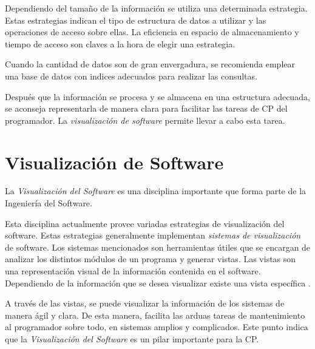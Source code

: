 \documentclass[a4paper,12pt]{report}
\begin{document}
Dependiendo del tamaño de la información se utiliza una determinada estrategia. Estas estrategias indican el tipo de estructura de datos a utilizar y las operaciones de acceso sobre ellas\cite{AAJU88,TSTA80}. La eficiencia en espacio de almacenamiento y tiempo de acceso son claves a la hora de elegir una estrategia.

Cuando la cantidad de datos son de gran envergadura, se recomienda emplear una base de datos con indices adecuados para realizar las consultas\cite{ERNS99}.

Después que la información se procesa y se almacena en una estructura adecuada, se aconseja representarla de manera clara para facilitar las tareas de CP del programador. La \textit{visualización de software} permite llevar a cabo esta tarea.


\section{Visualización de Software}

La \textit{Visualización del Software} es una disciplina importante que forma parte de la Ingeniería del Software.


Esta disciplina actualmente provee variadas estrategias de visualización del software. Estas estrategias generalmente implementan \textit{sistemas de visualización} de software. Los sistemas mencionados son herramientas útiles que se encargan de analizar los distintos módulos de un programa y generar vistas. 
Las vistas son una representación visual de la información contenida en el software. Dependiendo de la información que se desea visualizar existe una vista específica \cite{MPMR07}.%

A través de las vistas, se puede visualizar  la información de los sistemas de manera ágil y clara. De esta manera, facilita las arduas tareas de mantenimiento al programador sobre todo, en sistemas amplios y complicados. Este punto indica que la \textit{Visualización del Software} es un pilar importante para la CP.



\end{document}
